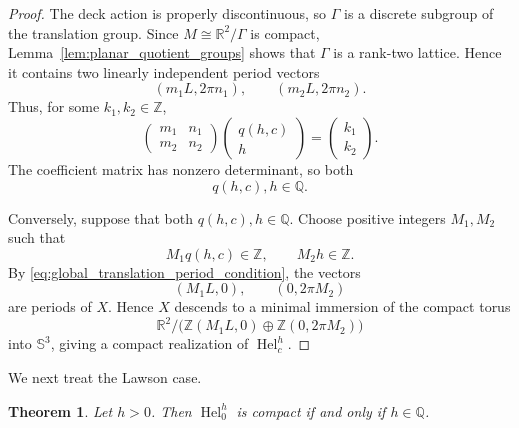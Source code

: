 \documentclass[a4paper,11pt]{amsart}
\numberwithin{equation}{section}
\theoremstyle{plain}
\newtheorem{thm}{Theorem}[section]
\begin{document}
\begin{proof}
The deck action is properly discontinuous, so $\Gamma$ is a discrete
subgroup of the translation group. Since
$M\cong\mathbb R^2/\Gamma$ is compact,
Lemma~\ref{lem:planar_quotient_groups} shows that $\Gamma$ is a
rank-two lattice. Hence it contains two
linearly independent period vectors
\[
(m_1L,2\pi n_1),
\qquad
(m_2L,2\pi n_2).
\]
Thus, for some $k_1,k_2\in\mathbb Z$,
\[
\begin{pmatrix}
m_1&n_1\\
m_2&n_2
\end{pmatrix}
\begin{pmatrix}
q(h,c)\\
h
\end{pmatrix}
=
\begin{pmatrix}
k_1\\
k_2
\end{pmatrix}.
\]
The coefficient matrix has nonzero determinant, so both
\[
q(h,c),h\in\mathbb Q.
\]

Conversely, suppose that both $q(h,c),h\in\mathbb Q$. Choose positive
integers $M_1,M_2$ such that
\[
M_1q(h,c)\in\mathbb Z,
\qquad
M_2h\in\mathbb Z.
\]
By \eqref{eq:global_translation_period_condition}, the vectors
\[
(M_1L,0),
\qquad
(0,2\pi M_2)
\]
are periods of $X$. Hence $X$ descends to a minimal immersion of the
compact torus
\[
\mathbb R^2/
\bigl(
\mathbb Z(M_1L,0)
\oplus
\mathbb Z(0,2\pi M_2)
\bigr)
\]
into $\mathbb S^3$, giving a compact realization of
$\operatorname{Hel}_c^h$.
\end{proof}

We next treat the Lawson case.

\begin{thm}
\label{thm:lawson_compactness}
Let $h>0$. Then $\operatorname{Hel}_0^h$ is compact if and only if
$h\in\mathbb Q$.
\end{thm}
\end{document}

